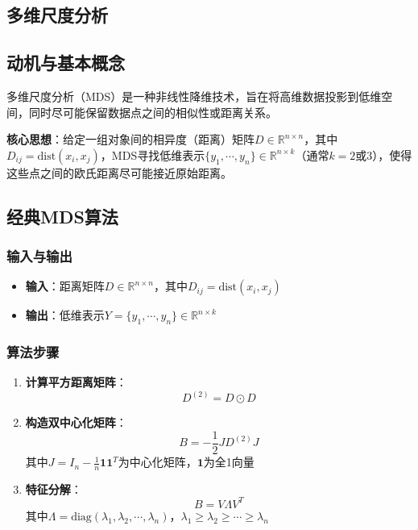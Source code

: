 \documentclass[lang=cn,newtx,10pt,scheme=chinese,chinesefont=nofont,citestyle=gb7714-2015, bibstyle=gb7714-2015]{elegantbook}
\begin{document}
\begin{refsection}
\section{多维尺度分析}
\subsection{动机与基本概念}

多维尺度分析（MDS）是一种非线性降维技术，旨在将高维数据投影到低维空间，同时尽可能保留数据点之间的相似性或距离关系。

\textbf{核心思想}：给定一组对象间的相异度（距离）矩阵$D \in \mathbb{R}^{n \times n}$，其中$D_{ij} = \text{dist}(x_i, x_j)$，MDS寻找低维表示$\{y_1, \cdots, y_n\} \in \mathbb{R}^{n \times k}$（通常$k=2$或$3$），使得这些点之间的欧氏距离尽可能接近原始距离。

\subsection{经典MDS算法}

\subsubsection{输入与输出}

\begin{itemize}
\item \textbf{输入}：距离矩阵$D \in \mathbb{R}^{n \times n}$，其中$D_{ij} = \text{dist}(x_i, x_j)$
\item \textbf{输出}：低维表示$Y = \{y_1, \cdots, y_n\} \in \mathbb{R}^{n \times k}$
\end{itemize}

\subsubsection{算法步骤}

\begin{enumerate}
\item \textbf{计算平方距离矩阵}：
   $$ D^{(2)} = D \odot D $$

\item \textbf{构造双中心化矩阵}：
   $$ B = -\frac{1}{2}JD^{(2)}J $$
   其中$J = I_n - \frac{1}{n}\mathbf{1}\mathbf{1}^T$为中心化矩阵，$\mathbf{1}$为全1向量

\item \textbf{特征分解}：
   $$ B = V\Lambda V^T $$
   其中$\Lambda = \text{diag}(\lambda_1, \lambda_2, \cdots, \lambda_n)$，$\lambda_1 \geq \lambda_2 \geq \cdots \geq \lambda_n$


\end{enumerate}
\end{refsection}
\end{document}
